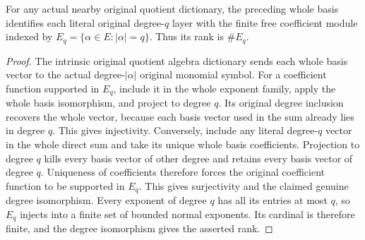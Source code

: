 \begin{lemma}
\label{hir:relative-normal-nearby-standard-degree-basis}
\leanok
{}
For any actual nearby original quotient dictionary, the preceding whole
basis identifies each literal original degree-$q$ layer with the finite
free coefficient module indexed by
$E_q=\{\alpha\in E:|\alpha|=q\}$. Thus its rank is $\#E_q$.
\end{lemma}
\begin{proof}
The intrinsic original quotient algebra dictionary sends each whole basis
vector to the actual degree-$|\alpha|$ original monomial symbol. For a
coefficient function supported in $E_q$, include it in the whole exponent
family, apply the whole basis isomorphism, and project to degree $q$.
Its original degree inclusion recovers the whole vector, because each
basis vector used in the sum already lies in degree $q$. This gives
injectivity. Conversely, include any literal degree-$q$ vector in the
whole direct sum and take its unique whole basis coefficients. Projection
to degree $q$ kills every basis vector of other degree and retains every
basis vector of degree $q$. Uniqueness of coefficients therefore forces
the original coefficient function to be supported in $E_q$. This gives
surjectivity and the claimed genuine degree isomorphism. Every exponent
of degree $q$ has all its entries at most $q$, so $E_q$ injects into a
finite set of bounded normal exponents. Its cardinal is therefore finite,
and the degree isomorphism gives the asserted rank.
\end{proof}

